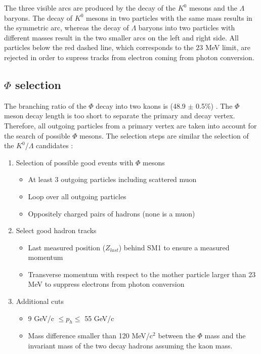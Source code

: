 The three visible arcs are produced by the decay of the $K^0$ mesons and the $\Lambda$ baryons. The decay of $K^0$ mesons in two particles with the same mass results in the symmetric arc, whereas the decay of $\Lambda$ baryons into two particles with different masses result in the two smaller arcs on the left and right side. All particles below the red dashed line, which corresponds to the $23$ MeV limit, are rejected in order to supress tracks from electron coming from photon conversion.

\subsection{$\Phi$ selection}

The branching ratio of the $\Phi$ decay into two kaons is (48.9 $\pm$ 0.5\%) \cite{PDG}. The $\Phi$ meson decay length is too short to separate the primary and decay vertex. Therefore, all outgoing particles from a primary vertex are taken into account for the search of possible $\Phi$ mesons. The selection steps are similar the selection of the $K^0$/$\Lambda$ candidates :

\begin{enumerate}
  \item Selection of possible good events with $\Phi$ mesons
  \begin{itemize}
    \item At least 3 outgoing particles including scattered muon
    \item Loop over all outgoing particles
    \item Oppositely charged pairs of hadrons (none is a muon)
  \end{itemize}
  \item Select good hadron tracks
  \begin{itemize}
    \item Last measured position ($Z_{last}$) behind SM1 to ensure a measured momentum
    \item Transverse momentum with respect to the mother particle larger than 23 MeV to suppress electrons from photon conversion
  \end{itemize}
  \item Additional cuts
  \begin{itemize}
    \item 9 GeV/c $\leq p_h \leq$ 55 GeV/c
    \item Mass difference smaller than 120 MeV/c$^2$ between the $\Phi$ mass and the invariant mass of the two decay hadrons assuming the kaon mass.
  \end{itemize}
\end{enumerate}

